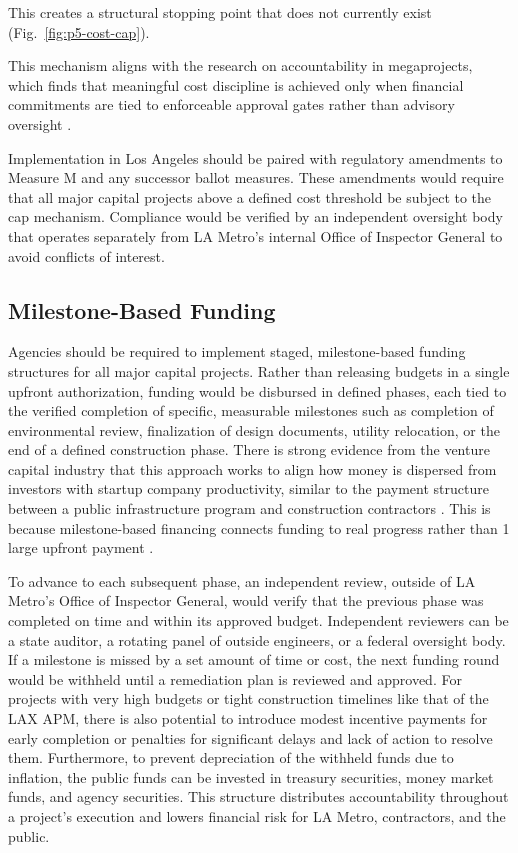\documentclass[12pt]{article}
\begin{document}
        This creates a structural stopping point that does not currently exist (Fig.~\ref{fig:p5-cost-cap}).

        This mechanism aligns with the research on accountability in megaprojects, which finds that meaningful cost discipline is achieved only when financial commitments are tied to enforceable approval gates rather than advisory oversight \cite{p7}.

        Implementation in Los Angeles should be paired with regulatory amendments to Measure M and any successor ballot measures. These amendments would require that all major capital projects above a defined cost threshold be subject to the cap mechanism. Compliance would be verified by an independent oversight body that operates separately from LA Metro's internal Office of Inspector General to avoid conflicts of interest.

        \subsection{Milestone-Based Funding}

        Agencies should be required to implement staged, milestone-based funding structures for all major capital projects. Rather than releasing budgets in a single upfront authorization, funding would be disbursed in defined phases, each tied to the verified completion of specific, measurable milestones such as completion of environmental review, finalization of design documents, utility relocation, or the end of a defined construction phase. There is strong evidence from the venture capital industry that this approach works to align how money is dispersed from investors with startup company productivity, similar to the payment structure between a public infrastructure program and construction contractors \cite{n10}. This is because milestone-based financing connects funding to real progress rather than 1 large upfront payment \cite{n10}.

        To advance to each subsequent phase, an independent review, outside of LA Metro's Office of Inspector General, would verify that the previous phase was completed on time and within its approved budget. Independent reviewers can be a state auditor, a rotating panel of outside engineers, or a federal oversight body. If a milestone is missed by a set amount of time or cost, the next funding round would be withheld until a remediation plan is reviewed and approved. For projects with very high budgets or tight construction timelines like that of the LAX APM, there is also potential to introduce modest incentive payments for early completion or penalties for significant delays and lack of action to resolve them. Furthermore, to prevent depreciation of the withheld funds due to inflation, the public funds can be invested in treasury securities, money market funds, and agency securities. This structure distributes accountability throughout a project's execution and lowers financial risk for LA Metro, contractors, and the public.
\end{document}
